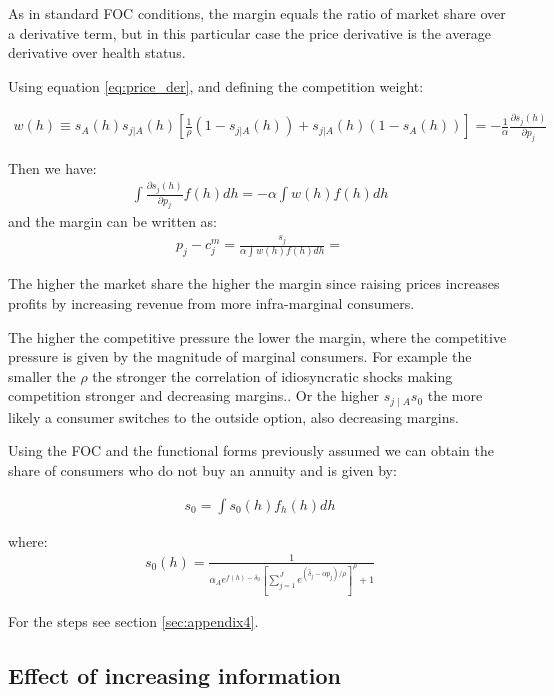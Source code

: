\documentclass[12pt]{article}
\theoremstyle{plain}
\theoremstyle{plain}
\begin{document}
As in standard FOC conditions, the margin equals the ratio of market share over a derivative term, but in this particular case the price derivative is the average derivative over health status. 

Using equation \ref{eq:price_der}, and defining the competition weight: 

\begin{align}\label{eq:comp_weight}
    w(h) \equiv s_A(h)s_{j|A}(h)\left[\frac{1}{\rho}(1-s_{j|A}(h)) + s_{j|A}(h)(1-s_A(h))\right]   = -\frac{1}{\alpha} \frac{\partial s_j(h)}{\partial p_j} 
\end{align}

Then we have: 
\begin{align}
    \int \frac{\partial s_j(h)}{\partial p_j} f(h) dh = - \alpha \int w(h) f(h) dh
\end{align}
and the margin can be written as: 
\begin{align}
    p_j- c^m_j  = \frac{ s_j}{\alpha \int w(h) f(h) dh} = 
\end{align}


The higher the market share the higher the margin since raising prices increases profits by increasing revenue from more infra-marginal consumers. 

The higher the competitive pressure the lower the margin, where the competitive pressure is given by the magnitude of marginal consumers. 
For example the smaller the $\rho$ the stronger the correlation of idiosyncratic shocks making competition stronger and decreasing margins.. Or the higher $s_{j\mid A} s_0$ the more likely a consumer switches to the outside option, also decreasing margins. 

Using the FOC and the functional forms previously assumed we can obtain the share of consumers who do not buy an annuity and is given by: 

\begin{align}\label{eq:outside_share2}
    s_0 = \int s_0(h) f_h(h) dh
\end{align}

where: \begin{align}
    s_0(h) = \frac{1}{\alpha_A e^{f(h) -\delta_0}\left[\sum_{j=1}^{J}e^{(\hat{\delta}_j  - \alpha p_j)/\rho}\right]^\rho + 1 } 
\end{align}

For the steps see section \ref{sec:appendix4}. 


\subsection{Effect of increasing information}
\end{document}
